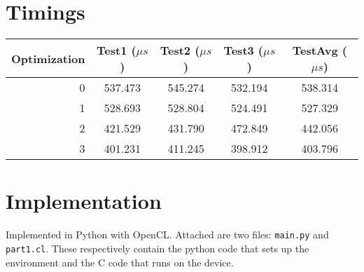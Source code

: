 \documentclass[12pt]{article}
\begin{document}
\section{ Timings }

\begin{center}
    \begin{tabular}{r | c | c | c | c |}
	\hline
   	Optimization & Test1 ($\mu s$) & Test2 ($\mu s$) & Test3 ($\mu s$) & TestAvg ($\mu s$) \\
   	\hline
   	0            & 537.473 & 545.274 & 532.194 & 538.314  \\
   	1            & 528.693 & 528.804 & 524.491 & 527.329  \\
   	2            & 421.529 & 431.790 & 472.849 & 442.056  \\
   	3            & 401.231 & 411.245 & 398.912 & 403.796  \\
    \end{tabular}
\end{center}

\newpage
\section{ Implementation }

Implemented in Python with OpenCL. Attached are two files: \texttt{main.py} and \texttt{part1.cl}. These respectively contain the python code that sets up the environment and the C code that runs on the device.
 
% 
\end{document}
